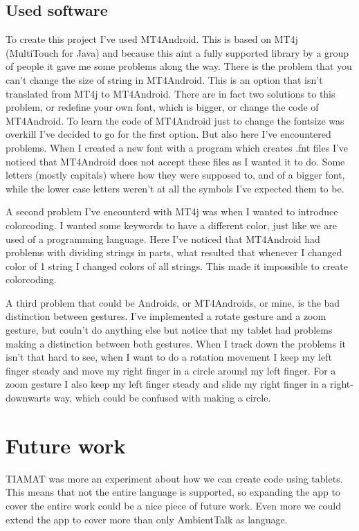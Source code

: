 \documentclass[a4paper,12pt]{report}
\begin{document}
\subsection{Used software}
To create this project I've used MT4Android. This is based on MT4j (MultiTouch for Java) and because this aint a fully supported library by a group of people it gave me some problems along the way. There is the problem that 
you can't change the size of string in MT4Android. This is an option that isn't translated from MT4j to MT4Android. There are in fact two solutions to this problem, or redefine your own font, which is bigger, or change the 
code of MT4Android. To learn the code of MT4Android just to change the fontsize was overkill I've decided to go for the first option. But also here I've encountered problems. When I created a new font with a program which
creates .fnt files I've noticed that MT4Android does not accept these files as I wanted it to do. Some letters (mostly capitals) where how they were supposed to, and of a bigger font, while the lower case letters weren't 
at all the symbols I've expected them to be.

A second problem I've encounterd with MT4j was when I wanted to introduce colorcoding. I wanted some keywords to have a different color, just like we are used of a programming language. Here I've noticed that
MT4Android had problems with dividing strings in parts, what resulted that whenever I changed color of 1 string I changed colors of all strings. This made it impossible to create colorcoding.

A third problem that could be Androids, or MT4Androids, or mine, is the bad distinction between gestures. I've implemented a rotate gesture and a zoom gesture, but couln't do anything else but notice that
my tablet had problems making a distinction between both gestures. When I track down the problems it isn't that hard to see, when I want to do a rotation movement I keep my left finger steady and move my right finger in a
circle around my left finger. For a zoom gesture I also keep my left finger steady and slide my right finger in a right-downwarts way, which could be confused with making a circle.

\section{Future work}
TIAMAT was more an experiment about how we can create code using tablets. This means that not the entire language is supported, so expanding the app to cover the entire work could be a nice piece of future work. Even more
we could extend the app to cover more than only AmbientTalk as language. 
\end{document}
